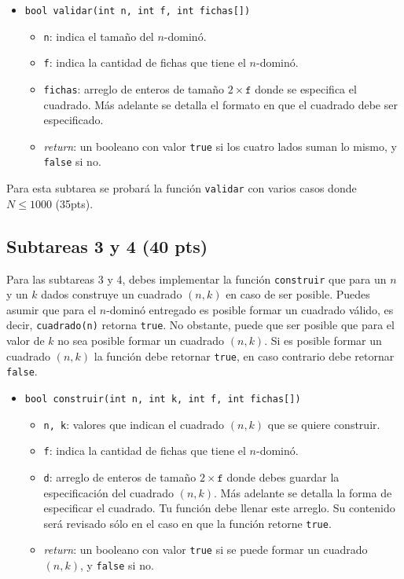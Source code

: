\documentclass{oci}
\begin{document}
\begin{itemize}
 \item \verb+bool validar(int n, int f, int fichas[])+
 \begin{itemize}
  \item \verb+n+: indica el tamaño del $n$-dominó.
  \item \verb+f+: indica la cantidad de fichas que tiene el $n$-dominó.
  \item \verb+fichas+: arreglo de enteros de tamaño $2\times\texttt{f}$ donde se especifica el cuadrado. Más adelante se detalla el formato en que el cuadrado debe ser especificado.
  \item \emph{return}: un booleano con valor \verb+true+ si los cuatro lados suman lo mismo, y \verb+false+ si no.
 \end{itemize}
\end{itemize}

Para esta subtarea se probará la función \verb+validar+ con varios casos donde $N\leq 1000$ (35pts).

\subsection*{Subtareas 3 y 4 (40 pts)}
Para las subtareas 3 y 4, debes implementar la función \verb+construir+ que para un $n$ y un $k$ dados construye un cuadrado $(n,k)$ en caso de ser posible.
Puedes asumir que para el $n$-dominó entregado es posible formar un cuadrado válido, es decir, \verb+cuadrado(n)+ retorna \verb+true+.
No obstante, puede que ser posible que para el valor de $k$ no sea posible formar un cuadrado $(n,k)$.
Si es posible formar un cuadrado $(n,k)$ la función debe retornar \verb+true+, en caso contrario debe retornar \verb+false+.
\begin{itemize}
 \item \verb+bool construir(int n, int k, int f, int fichas[])+
 \begin{itemize}
  \item \verb+n, k+: valores que indican el cuadrado $(n,k)$ que se quiere construir.
  \item \verb+f+: indica la cantidad de fichas que tiene el $n$-dominó.
  \item \verb+d+: arreglo de enteros de tamaño $2\times\texttt{f}$ donde debes guardar la especificación del cuadrado $(n,k)$. Más adelante se detalla la forma de especificar el cuadrado.
    Tu función debe llenar este arreglo. Su contenido será revisado sólo en el caso en que la función retorne \verb+true+.
  \item \emph{return}: un booleano con valor \verb+true+ si se puede formar un cuadrado $(n,k)$, y \verb+false+ si no.
 \end{itemize}
\end{itemize}
\end{document}
